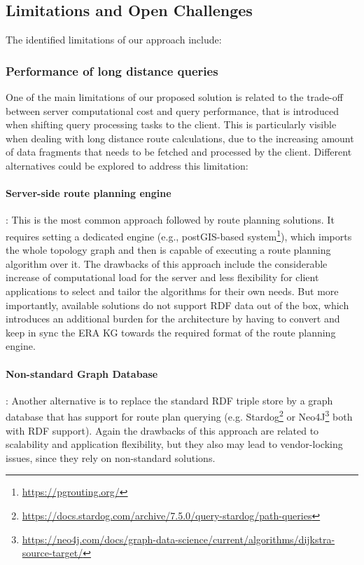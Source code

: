\subsection{Limitations and Open Challenges}

The identified limitations of our approach include:

\subsubsection{Performance of long distance queries}

One of the main limitations of our proposed solution
is related to the trade-off between
server computational cost and query performance,
that is introduced when shifting query processing tasks to the client.
This is particularly visible when dealing with long distance route calculations,
due to the increasing amount of data fragments
that needs to be fetched and processed by the client.
Different alternatives could be explored to address this limitation:

\paragraph{Server-side route planning engine}: This is the most common approach followed by route planning solutions.
It requires setting a dedicated engine (e.g., postGIS-based system\footnote{\url{https://pgrouting.org/}}),
which imports the whole topology graph
and then is capable of executing a route planning algorithm over it.
The drawbacks of this approach include
the considerable increase of computational load for the server
and less flexibility for client applications to select
and tailor the algorithms for their own needs.
But more importantly,
available solutions do not support RDF data out of the box,
which introduces an additional burden for the architecture
by having to convert and keep in sync the ERA KG
towards the required format of the route planning engine.

\paragraph{Non-standard Graph Database}: Another alternative is to replace
the standard RDF triple store by a graph database that has support
for route plan querying (e.g. Stardog\footnote{\url{https://docs.stardog.com/archive/7.5.0/query-stardog/path-queries}} or Neo4J\footnote{\url{https://neo4j.com/docs/graph-data-science/current/algorithms/dijkstra-source-target/}} both with RDF support).
Again the drawbacks of this approach are related to scalability
and application flexibility, but they also may lead to vendor-locking issues,
since they rely on non-standard solutions.

